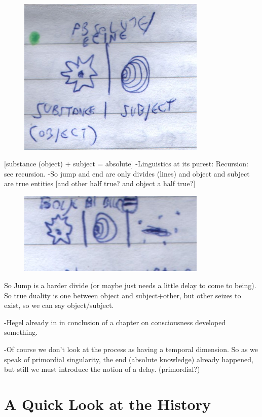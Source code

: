 \documentclass{book}
\begin{document}
\begin{figure}[ht!]
\centering
\includegraphics[width=90mm]{scan09.jpg}
\label{overflow}
\end{figure}
[substance (object) +  subject = absolute]
-Linguistics at its purest: Recursion: see recursion.
-So jump and end are only divides (lines) and object and subject are true entities [and other half true? and object a half true?] 
\begin{figure}[ht!]
\centering
\includegraphics[width=90mm]{scan10.jpg}
\label{overflow}
\end{figure}
So Jump is a harder divide (or maybe just needs a little delay to come to being). So true duality is one between object and subject+other, but other seizes to exist, so we can say object/subject.

-Hegel already in in conclusion of a chapter on consciousness developed something.

-Of course we don't look at the process as having a temporal dimension. So as we speak of primordial singularity, the end (absolute knowledge) already happened, but still we must introduce the notion of a delay. (primordial?) 

\chapter{A Quick Look at the History}
\end{document}
